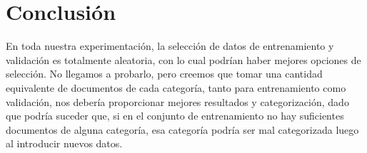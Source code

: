 \section{Conclusión}

En toda nuestra experimentación, la selección de datos de entrenamiento y validación es totalmente aleatoria, con lo cual podrían haber
mejores opciones de selección. No llegamos a probarlo, pero creemos que tomar una cantidad equivalente de documentos de cada categoría, 
tanto para entrenamiento como validación, nos debería proporcionar mejores resultados y categorización, dado que podría suceder que, 
si en el conjunto de entrenamiento no hay suficientes documentos de alguna categoría, esa categoría podría ser mal categorizada luego al
introducir nuevos datos.
